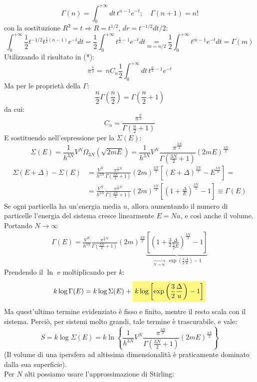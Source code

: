 \documentclass[12pt]{article}
\begin{document}
\[
\Gamma(n) =\int_0^{+\infty} dt\,t^{n-1}e^{-t}; \quad \Gamma(n+1)=n!
\]
con la sostituzione $R^2=t \Rightarrow R=t^{1/2}$, $dr = t^{-1/2}dt/2$:
\[
\int_0^{+\infty} \frac{1}{2}t^{-1/2} t^{\frac{1}{2}(n-1)}e^{-t}dt = \frac{1}{2}\int_0^{+\infty}t^{\frac{1}{2}-1}e^{-t}dt \underset{m=n/2}{=} \frac{1}{2}\int_0^{+\infty}t^{m-1}e^{-t}dt=\Gamma(m)
\]
Utilizzando il risultato in (*):
\[
\pi^{\frac{n}{2}} =\ nC_n \frac{1}{2}\int_0^{+\infty}dt\,t^{\frac{n}{2}-1}e^{-t}
\]
Ma per le proprietà della $\Gamma$:
\[
\frac{n}{2}\Gamma\left(\frac{n}{2}\right) =\Gamma\left(\frac{n}{2}+1\right)
\]
da cui:
\[
C_n = \frac{\pi^{\frac{n}{2}}}{\Gamma\left(\frac{n}{2}+1\right)}
\]
E sostituendo nell'espressione per la $\Sigma(E)$:
\[
\Sigma(E) = \frac{1}{h^{3N}}V^N \Omega_{3N}(\sqrt{2mE}) = \frac{1}{h^{3N}}V^N \frac{\pi^{\frac{3N}{2}}}{\Gamma\left(\frac{3N}{2}+1\right)}(2mE)^{\frac{3N}{2}}
\]
\begin{align*}
\Sigma(E+\Delta)-\Sigma(E)&=\frac{V^N}{h^{3N}}\frac{\pi^{\frac{3}{2}N}}{\Gamma\left(\frac{3N}{2}+1\right)}(2m)^{\frac{3N}{2}}
\left[(E+\Delta)^{\frac{3N}{2}}-E^{\frac{3N}{2}}\right] =\\
&= \frac{V^N}{h^{3N}}\frac{\pi^{\frac{3}{2}N}}{\Gamma\left(\frac{3N}{2}+1\right)}(2m)^{\frac{3N}{2}} \left [\left(1+\frac{\Delta}{E}\right)^{\frac{3N}{2}}-1\right] \equiv \Gamma(E) 
\end{align*}
Se ogni particella ha un'energia media $u$, allora aumentando il numero di particelle l'energia del sistema cresce linearmente $E=Nu$, e così anche il volume. Portando $N\to\infty$
\begin{align*}
\Gamma(E) = \frac{V^N}{h^{3N}}\frac{\pi^{\frac{3}{2}N}}{\Gamma\left(\frac{3N}{2}+1\right)}(2m)^{\frac{3N}{2}} \underbrace{\left [\left(1+\frac{3}{2}\frac{\Delta}{\frac{3}{2}E}\right)^{\frac{3N}{2}}-1\right]}_{\xrightarrow[N\to\infty]{}\>\exp\left(\frac{3}{2}\frac{\Delta}{u}\right)-1}
\end{align*}
Prendendo il $\ln$ e moltiplicando per $k$:
\[
k\log\Gamma(E)=k\log\Sigma(E)+\hlc{Yellow}{k\log\left[\exp\left(\frac{3}{2}\frac{\Delta}{u}\right)-1\right]
}\]
Ma quest'ultimo termine evidenziato è fisso e finito, mentre il resto scala con il sistema. Perciò, per sistemi molto grandi, tale termine è trascurabile, e vale:
\[
S=k\log\Sigma(E)=k\ln\left\{
\frac{1}{h^{3N}}V^N \frac{\pi^{\frac{3N}{2}}}{\Gamma\left(\frac{3N}{2}+1\right)}(2mE)^{\frac{3N}{2}}
 \right \}
\]
(Il volume di una ipersfera ad altissima dimensionalità è praticamente dominato dalla sua superficie).\\
Per $N$ alti possiamo usare l'approssimazione di Stirling:
\end{document}
